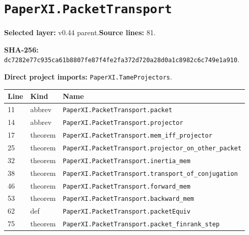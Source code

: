 \documentclass[10pt,oneside]{book}
\begin{document}
\section{\texorpdfstring{\nolinkurl{PaperXI.PacketTransport}}{PaperXI.PacketTransport}}\label{module:PaperXI.PacketTransport}

\textbf{Selected layer:} v0.44 parent.\quad\textbf{Source lines:} 81.\par\textbf{SHA-256:} {\scriptsize\nolinkurl{dc7282e77c935ca61b8807fe87f4fe2fa372d720a28d0a1c8982c6c749e1a910}}.


\textbf{Direct project imports:} \nolinkurl{PaperXI.TameProjectors}.

\begin{longtable}{@{}p{}p{}p{}@{}}\toprule Line&Kind&Name\\\midrule\endhead

11&abbrev&\nolinkurl{PaperXI.PacketTransport.packet}\\

14&abbrev&\nolinkurl{PaperXI.PacketTransport.projector}\\

17&theorem&\nolinkurl{PaperXI.PacketTransport.mem_iff_projector}\\

25&theorem&\nolinkurl{PaperXI.PacketTransport.projector_on_other_packet}\\

32&theorem&\nolinkurl{PaperXI.PacketTransport.inertia_mem}\\

38&theorem&\nolinkurl{PaperXI.PacketTransport.transport_of_conjugation}\\

46&theorem&\nolinkurl{PaperXI.PacketTransport.forward_mem}\\

53&theorem&\nolinkurl{PaperXI.PacketTransport.backward_mem}\\

62&def&\nolinkurl{PaperXI.PacketTransport.packetEquiv}\\

75&theorem&\nolinkurl{PaperXI.PacketTransport.packet_finrank_step}\\

\bottomrule\end{longtable}
\end{document}
